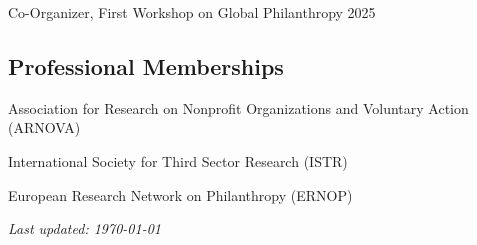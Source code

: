 \documentclass[11pt,letterpaper]{article}
\begin{document}
Co-Organizer, First Workshop on Global Philanthropy \hfill 2025

\subsection*{Professional Memberships}

Association for Research on Nonprofit Organizations and Voluntary Action (ARNOVA)

International Society for Third Sector Research (ISTR)

European Research Network on Philanthropy (ERNOP)

\vfill
\begin{center}
    \textit{Last updated: \today}
\end{center}
\end{document}
